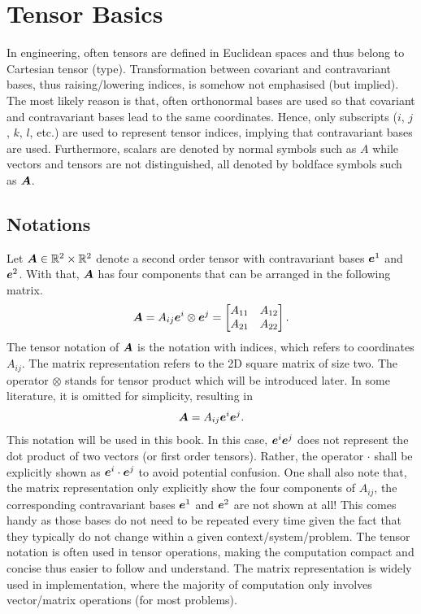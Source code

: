\chapter{Tensor Basics}
In engineering, often tensors are defined in Euclidean spaces and thus belong to Cartesian tensor (type).
Transformation between covariant and contravariant bases, thus raising/lowering indices, is somehow not emphasised (but implied).
The most likely reason is that, often orthonormal bases are used so that covariant and contravariant bases lead to the same coordinates.
Hence, only subscripts ($i$, $j$, $k$, $l$, etc.) are used to represent tensor indices, implying that contravariant bases are used. Furthermore, scalars are denoted by normal symbols such as $A$ while vectors and tensors are not distinguished, all denoted by boldface symbols such as $\bm{A}$.
\section{Notations}
Let $\bm{A}\in\mathbb{R}^2\times\mathbb{R}^2$ denote a second order tensor with contravariant bases $\bm{e}^1$ and $\bm{e}^2$. With that, $\bm{A}$ has four components that can be arranged in the following matrix.
\begin{gather}\label{eq:matrix_tensor}
\bm{A}=A_{ij}\bm{e}^i\otimes\bm{e}^j=\begin{bmatrix}
A_{11}&A_{12}\\
A_{21}&A_{22}
\end{bmatrix}.
\end{gather}
The tensor notation of $\bm{A}$ is the notation with indices, which refers to coordinates $A_{ij}$.
The matrix representation refers to the 2D square matrix of size two.
The operator $\otimes$ stands for tensor product which will be introduced later.
In some literature, it is omitted for simplicity, resulting in
\begin{gather}
\bm{A}=A_{ij}\bm{e}^i\bm{e}^j.
\end{gather}
This notation will be used in this book.
In this case, $\bm{e}^i\bm{e}^j$ does not represent the dot product of two vectors (or first order tensors).
Rather, the operator $\cdot$ shall be explicitly shown as $\bm{e}^i\cdot\bm{e}^j$ to avoid potential confusion.
One shall also note that, the matrix representation only explicitly show the four components of $A_{ij}$, the corresponding contravariant bases $\bm{e}^1$ and $\bm{e}^2$ are not shown at all!
This comes handy as those bases do not need to be repeated every time given the fact that they typically do not change within a given context/system/problem.
The tensor notation is often used in tensor operations, making the computation compact and concise thus easier to follow and understand.
The matrix representation is widely used in implementation, where the majority of computation only involves vector/matrix operations (for most problems).

